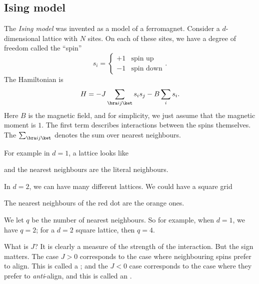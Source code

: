 \documentclass[a4paper]{article}
\begin{document}
\subsection{Ising model}
The \emph{Ising model} was invented as a model of a ferromagnet. Consider a $d$-dimensional lattice with $N$ sites. On each of these sites, we have a degree of freedom called the ``spin''
\[
  s_i =
  \begin{cases}
    +1 & \text{spin up}\\
    -1 & \text{spin down}
  \end{cases}.
\]
The Hamiltonian is
\[
  H = -J \sum_{\bra i j\ket} s_i s_j - B \sum_i s_i.
\]
Here $B$ is the magnetic field, and for simplicity, we just assume that the magnetic moment is $1$. The first term describes interactions between the spins themselves. The $\sum_{\bra i j\ket}$ denotes the sum over nearest neighbours.

For example in $d = 1$, a lattice looks like
\begin{center}
\end{center}
and the nearest neighbours are the literal neighbours.

In $d = 2$, we can have many different lattices. We could have a square grid
\begin{center}
\end{center}
The nearest neighbours of the red dot are the orange ones.

We let $q$ be the number of nearest neighbours. So for example, when $d = 1$, we have $q = 2$; for a $d = 2$ square lattice, then $q = 4$.

What is $J$? It is clearly a measure of the strength of the interaction. But the sign matters. The case $J > 0$ corresponds to the case where neighbouring spins prefer to align. This is called a ; and the $J < 0$ case corresponds to the case where they prefer to \emph{anti}-align, and this is called an .
\end{document}
